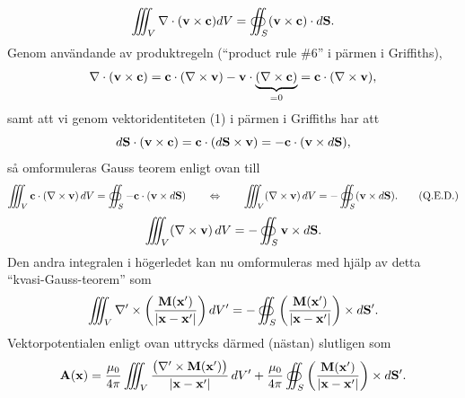 {{{{{{   $$
      \iiint_V\nabla\cdot({\bf v}\times{\bf c}) dV
        =\oiint_S({\bf v}\times{\bf c})\cdot d{\bf S}.
   $$
   Genom anv{\"a}ndande av produktregeln (``product rule \#6'' i p{\"a}rmen i
   Griffiths),
   $$
     \nabla\cdot({\bf v}\times{\bf c})
       ={\bf c}\cdot(\nabla\times{\bf v})
         -{\bf v}\cdot\underbrace{(\nabla\times{\bf c})}_{=0}
       ={\bf c}\cdot(\nabla\times{\bf v}),
   $$
   samt att vi genom vektoridentiteten (1) i p{\"a}rmen i Griffiths har att
   $$
     d{\bf S}\cdot({\bf v}\times{\bf c})
       = {\bf c}\cdot(d{\bf S}\times{\bf v})
       = -{\bf c}\cdot({\bf v}\times d{\bf S}),
   $$
   s{\aa} omformuleras Gauss teorem  enligt ovan till
   $$
     \iiint_V {\bf c}\cdot(\nabla\times{\bf v})\,dV
       =\oiint_S -{\bf c}\cdot({\bf v}\times d{\bf S})
     \qquad\Leftrightarrow\qquad
     \iiint_V (\nabla\times{\bf v})\,dV
       =-\oiint_S ({\bf v}\times d{\bf S}).
     \qquad\hbox{(Q.E.D.)}
   $$}
$$
  \iiint_V(\nabla\times{\bf v})\,dV = -\oiint_{S} {\bf v}\times d{\bf S}.
$$
Den andra integralen i h{\"o}gerledet kan nu omformuleras med hj{\"a}lp av
detta ``kvasi-Gauss-teorem'' som
$$
  \iiint_V\nabla'\times\bigg({{{\bf M}({\bf x}')}
    \over{|{\bf x}-{\bf x}'|}}\bigg)\,dV'
  = -\oiint_{S}\bigg({{{\bf M}({\bf x}')}
       \over{|{\bf x}-{\bf x}'|}}\bigg)\times d{\bf S}'.
$$
Vektorpotentialen enligt ovan uttrycks d{\"a}rmed (n{\"a}stan) slutligen som
$$
  {\bf A}({\bf x}) = {{\mu_0}\over{4\pi}}\iiint_V
    {{\big(\nabla'\times{\bf M}({\bf x}')\big)}\over{|{\bf x}-{\bf x}'|}}\,dV'
  +{{\mu_0}\over{4\pi}}\oiint_S
     \bigg({{{\bf M}({\bf x}')}\over{|{\bf x}-{\bf x}'|}}\bigg)\times d{\bf S}'.
$$
\vfill\eject

}}}}}
